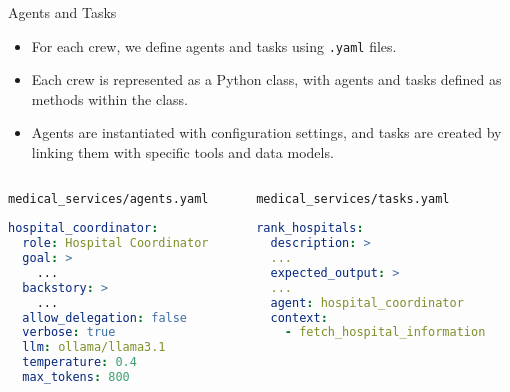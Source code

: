 \begin{frame}[fragile]{Agents and Tasks}
    \begin{itemize}
        \item For each crew, we define agents and tasks using \texttt{.yaml} files.
        \item Each crew is represented as a Python class, with agents and tasks defined as methods within the class.
        \item Agents are instantiated with configuration settings, and tasks are created by linking them with specific tools and data models.
    \end{itemize}
      \begin{columns}
        \begin{column}{0.48\textwidth} %
            \centering%
  \texttt{medical\_services/agents.yaml}
            \begin{lstlisting}[language=yaml]
hospital_coordinator:
  role: Hospital Coordinator
  goal: >
    ...
  backstory: >
    ...
  allow_delegation: false
  verbose: true
  llm: ollama/llama3.1
  temperature: 0.4
  max_tokens: 800

            \end{lstlisting}
        \end{column}
        \begin{column}{0.48\textwidth} %
            \centering
              \texttt{medical\_services/tasks.yaml}
            \begin{lstlisting}[language=yaml]
rank_hospitals:
  description: >
  ...
  expected_output: >
  ...
  agent: hospital_coordinator
  context:
    - fetch_hospital_information
            \end{lstlisting}
        \end{column}
      \end{columns}
\end{frame}